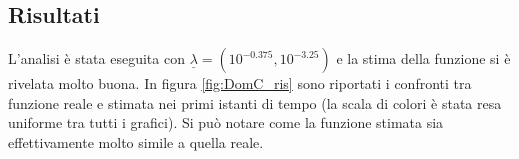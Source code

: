 \documentclass[a4paper,11pt,twoside,openright]{book}							%
\begin{document}
\subsection{Risultati}
L'analisi è stata eseguita con $\underline \lambda = (10^{-0.375}, 10^{-3.25})$ e la stima della funzione si è rivelata molto buona. In figura \ref{fig:DomC_ris} sono riportati i confronti tra funzione reale e stimata nei primi istanti di tempo (la scala di colori è stata resa uniforme tra tutti i grafici). Si può notare come la funzione stimata sia effettivamente molto simile a quella reale.
\begin{figure}[H]
\centering
\end{figure}
\end{document}
